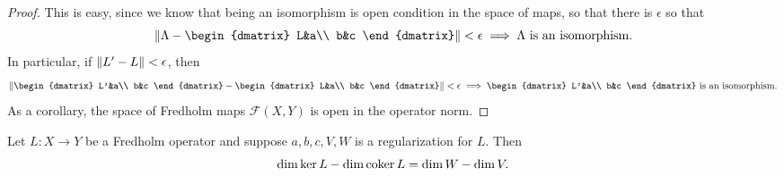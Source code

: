  \begin{proof}
   This is easy, since we know that being an isomorphism is open
   condition in the space of maps, so that there is $\epsilon$ so that
   \begin{equation*}
     \norm{\Lambda-
       \begin{dmatrix}
         L&a\\
         b&c
       \end{dmatrix}
}<\epsilon\implies \Lambda\text{ is an isomorphism}.
\end{equation*}
In particular, if $\left\lVert L'-L\right\rVert<\epsilon$, then 
\begin{equation*}
  \norm{\begin{dmatrix}
         L'&a\\
         b&c
       \end{dmatrix}-\begin{dmatrix}
         L&a\\
         b&c
       \end{dmatrix}}<\epsilon\implies \begin{dmatrix}
         L'&a\\
         b&c
       \end{dmatrix}\text{ is an isomorphism}.
     \end{equation*}
     As a corollary, the space of Fredholm maps $\mathscr{F}(X,Y)$ is
     open in the operator norm.
   \end{proof}
   \begin{prop}
     Let $L:X\to Y$ be a Fredholm operator and suppose
     $a,b,c,V,W$ is a regularization for $L$. Then
     \begin{equation*}
       \dim \ker L-\dim \operatorname{\mathrm{coker}} L=\dim W-\dim V.
     \end{equation*}     
   \end{prop}
